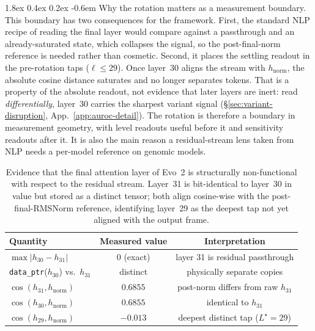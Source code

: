\documentclass{article}
\makeatletter
\renewcommand\paragraph{\@startsection{paragraph}{4}{\z@}%
  {1.8ex \@plus 0.4ex \@minus 0.2ex}%
  {-0.6em}%
{\normalfont\normalsize\bfseries}}
\theoremstyle{plain}
\theoremstyle{definition}
\theoremstyle{remark}
\newcommand{\hnorm}{h_{\mathrm{norm}}}
\makeatother
\begin{document}
\paragraph{Why the rotation matters as a measurement boundary.} This boundary has two consequences for the framework. First, the standard NLP recipe of reading the final layer would compare against a passthrough and an already-saturated state, which collapses the signal, so the post-final-norm reference is needed rather than cosmetic. Second, it places the settling readout in the pre-rotation taps ($\ell \le 29$). Once layer~30 aligns the stream with $\hnorm$, the absolute cosine distance saturates and no longer separates tokens. That is a property of the absolute readout, not evidence that later layers are inert: read \emph{differentially}, layer~30 carries the sharpest variant signal (\S\ref{sec:variant-disruption}, App.~\ref{app:auroc-detail}). The rotation is therefore a boundary in measurement geometry, with level readouts useful before it and sensitivity readouts after it. It is also the main reason a residual-stream lens taken from NLP needs a per-model reference on genomic models.

\begin{table}[!htbp]
  \caption{Evidence that the final attention layer of Evo~2 is structurally non-functional with respect to the residual stream. Layer~31 is bit-identical to layer~30 in value but stored as a distinct tensor; both align cosine-wise with the post-final-RMSNorm reference, identifying layer~29 as the deepest tap not yet aligned with the output frame.}
  \label{tab:idle-block}
  \centering
  \small
  \begin{tabular}{@{}lcc@{}}
    \toprule
    Quantity & Measured value & Interpretation \\
    \midrule
    $\max\bigl|h_{30}-h_{31}\bigr|$ & $0$ (exact) &
    layer 31 is residual passthrough \\
    \texttt{data\_ptr}($h_{30}$) vs.\ $h_{31}$ & distinct &
    physically separate copies \\
    $\cos(h_{31}, \hnorm)$ & $0.6855$ &
    post-norm differs from raw $h_{31}$ \\
    $\cos(h_{30}, \hnorm)$ & $0.6855$ &
    identical to $h_{31}$ \\
    $\cos(h_{29}, \hnorm)$ & $-0.013$ &
    deepest distinct tap ($L^{\star}=29$) \\
    \bottomrule
  \end{tabular}
\end{table}
\end{document}
